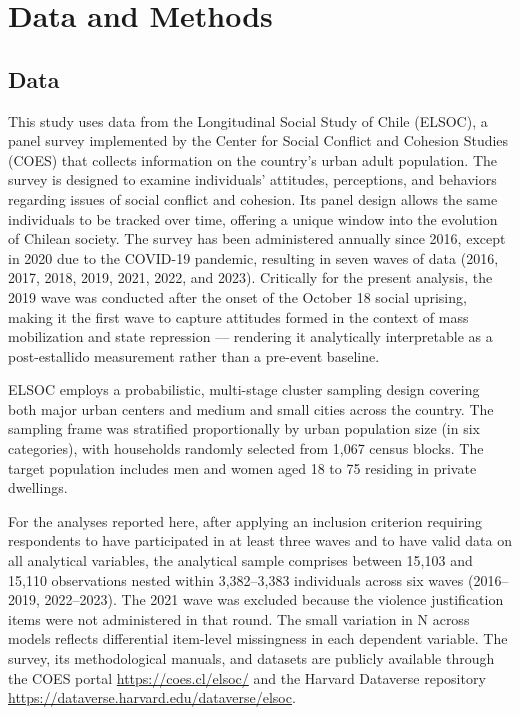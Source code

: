 \documentclass[
  13pt,
]{article}
\begin{document}
\section{Data and Methods}\label{data-and-methods}

\subsection{Data}\label{data}

This study uses data from the Longitudinal Social Study of Chile
(ELSOC), a panel survey implemented by the Center for Social Conflict
and Cohesion Studies (COES) that collects information on the country's
urban adult population. The survey is designed to examine individuals'
attitudes, perceptions, and behaviors regarding issues of social
conflict and cohesion. Its panel design allows the same individuals to
be tracked over time, offering a unique window into the evolution of
Chilean society. The survey has been administered annually since 2016,
except in 2020 due to the COVID-19 pandemic, resulting in seven waves of
data (2016, 2017, 2018, 2019, 2021, 2022, and 2023). Critically for the
present analysis, the 2019 wave was conducted after the onset of the
October 18 social uprising, making it the first wave to capture
attitudes formed in the context of mass mobilization and state
repression --- rendering it analytically interpretable as a
post-estallido measurement rather than a pre-event baseline.

ELSOC employs a probabilistic, multi-stage cluster sampling design
covering both major urban centers and medium and small cities across the
country. The sampling frame was stratified proportionally by urban
population size (in six categories), with households randomly selected
from 1,067 census blocks. The target population includes men and women
aged 18 to 75 residing in private dwellings.

For the analyses reported here, after applying an inclusion criterion
requiring respondents to have participated in at least three waves and
to have valid data on all analytical variables, the analytical sample
comprises between 15,103 and 15,110 observations nested within
3,382--3,383 individuals across six waves (2016--2019, 2022--2023). The
2021 wave was excluded because the violence justification items were not
administered in that round. The small variation in N across models
reflects differential item-level missingness in each dependent variable.
The survey, its methodological manuals, and datasets are publicly
available through the COES portal \url{https://coes.cl/elsoc/} and the
Harvard Dataverse repository
\url{https://dataverse.harvard.edu/dataverse/elsoc}.
\end{document}
